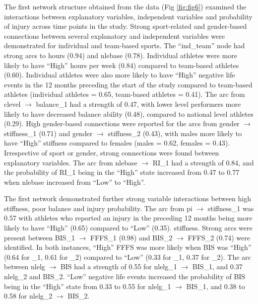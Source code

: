 \documentclass[
  english,
  man]{apa6}
\begin{document}
The first network structure obtained from the data (Fig \ref{fig:fig6}) examined the interactions between explanatory variables, independent variables and probability of injury across time points in the study.
Strong sport-related and gender-based connections between several explanatory and independent variables were demonstrated for individual and team-based sports.
The ``ind\_team'' node had strong arcs to hours (0.94) and nlebase (0.78).
Individual athletes were more likely to have ``High'' hours per week (0.84) compared to team-based athletes (0.60).
Individual athletes were also more likely to have ``High'' negative life events in the 12 months preceding the start of the study compared to team-based athletes (individual athletes = 0.65, team-based athletes = 0.41).
The arc from clevel \(\rightarrow\) balance\_1 had a strength of 0.47, with lower level performers more likely to have decreased balance ability (0.48), compared to national level athletes (0.29).
High gender-based connections were reported for the arcs from gender \(\rightarrow\) stiffness\_1 (0.71) and gender \(\rightarrow\) stiffness\_2 (0.43), with males more likely to have ``High'' stiffness compared to females (males = 0.62, females = 0.43).
Irrespective of sport or gender, strong connections were found between explanatory variables. The arc from nlebase \(\rightarrow\) RI\_1 had a strength of 0.84, and the probability of RI\_1 being in the ``High'' state increased from 0.47 to 0.77 when nlebase increased from ``Low'' to ``High''.

The first network demonstrated further strong variable interactions between high stiffness, poor balance and injury probability.
The arc from pi \(\rightarrow\) stiffness\_1 was 0.57 with athletes who reported an injury in the preceding 12 months being more likely to have ``High'' (0.65) compared to ``Low'' (0.35). stiffness.
Strong arcs were present between BIS\_1 \(\rightarrow\) FFFS\_1 (0.98) and BIS\_2 \(\rightarrow\) FFFS\_2 (0.74) were identified.
In both instances, ``High'' FFFS was more likely when BIS was ``High'' (0.64 for \_1, 0.61 for \_2) compared to ``Low'' (0.33 for \_1, 0.37 for \_2).
The arc between nlelg \(\rightarrow\) BIS had a strength of 0.55 for nlelg\_1 \(\rightarrow\) BIS\_1, and 0.37 nlelg\_2 and BIS\_2.
``Low'' negative life events increased the probability of BIS being in the ``High'' state from 0.33 to 0.55 for nlelg\_1 \(\rightarrow\) BIS\_1, and 0.38 to 0.58 for nlelg\_2 \(\rightarrow\) BIS\_2.
\end{document}
